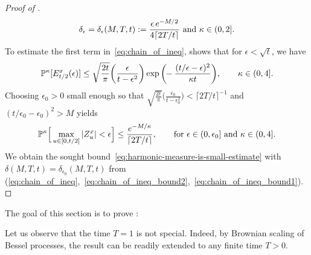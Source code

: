 \documentclass[a4paper, 11pt]{article}
\theoremstyle{definition}
\numberwithin{equation}{section}
\numberwithin{figure}{section}
\newcommand{\bessel}[1][]{{\ifx&#1&\else{^{#1 \!}}\fi}Z}
\newcommand{\BMmeasure}[2][]{\bP^{#2}_{\!#1}}
\begin{document}
\begin{proof}[Proof of ]
\begin{align}
\delta_\epsilon = \delta_\epsilon(M,T,t) :=
\frac{\epsilon \, e^{-M/2}}{4 \lceil 2T/t \rceil} \textnormal{ and } \kappa \in (0,2] .
\end{align}
To estimate the first term  
in~\eqref{eq:chain_of_ineq}, 
 shows that for 
$\epsilon < \sqrt t$, we have
\begin{align*}
	\BMmeasure{\kappa}[ E^x_{t/2}(\epsilon)  ] \le \sqrt{\frac{ 2t}{\pi}}\bigg(\frac{\epsilon}{t-\epsilon^2}\bigg)\exp\bigg( \!\! -\frac{(t/\epsilon - \epsilon)^2}{\kappa t}\bigg), \qquad \kappa \in (0,4].
\end{align*}
Choosing $\epsilon_0 > 0$ small enough so that $\sqrt{\frac{2t}{\pi}}\big(\frac{\epsilon_0}{t-\epsilon_0^2}\big) < \lceil 2T/t \rceil^{-1}$ and $(t/\epsilon_0 - \epsilon_0)^2 > M$ yields
\begin{align}\label{eq:chain_of_ineq_bound1}
	\BMmeasure{\kappa}\Big[ \max_{u \in [0,t/2]} |\bessel^x_u| < \epsilon \Big] \le \frac{e^{-M/\kappa}}{\lceil 2T/t \rceil} , \qquad
	\textnormal{for }
	\epsilon \in (0,\epsilon_0] \textnormal{ and } 
	\kappa \in (0, 4] .
\end{align}
We obtain the sought bound~\eqref{eq:harmonic-measure-is-small-estimate} with $\delta(M,T,t) = \delta_{\epsilon_0}(M,T,t)$ from 
(\ref{eq:chain_of_ineq},~\ref{eq:chain_of_ineq_bound2},~\ref{eq:chain_of_ineq_bound1}).
\end{proof}



The goal of this section is to prove :

\tightFunctionset*

Let us observe that the time $T = 1$ is not special. 
Indeed, by Brownian scaling of Bessel processes, the result can be readily extended to any finite time $T > 0$.
\end{document}
